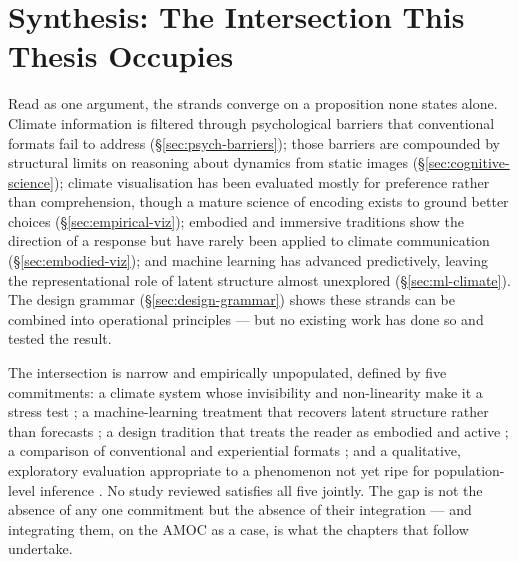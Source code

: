 \section{Synthesis: The Intersection This Thesis Occupies}
\label{sec:literature-synthesis}
 
Read as one argument, the strands converge on a proposition none states alone. Climate information is filtered through psychological barriers that conventional formats fail to address (\S\ref{sec:psych-barriers}); those barriers are compounded by structural limits on reasoning about dynamics from static images (\S\ref{sec:cognitive-science}); climate visualisation has been evaluated mostly for preference rather than comprehension, though a mature science of encoding exists to ground better choices (\S\ref{sec:empirical-viz}); embodied and immersive traditions show the direction of a response but have rarely been applied to climate communication (\S\ref{sec:embodied-viz}); and machine learning has advanced predictively, leaving the representational role of latent structure almost unexplored (\S\ref{sec:ml-climate}). The design grammar (\S\ref{sec:design-grammar}) shows these strands can be combined into operational principles --- but no existing work has done so and tested the result.
 
The intersection is narrow and empirically unpopulated, defined by five commitments: a climate system whose invisibility and non-linearity make it a stress test \citep{lenton2008, armstrongmckay2022}; a machine-learning treatment that recovers latent structure rather than forecasts \citep{sonnewald2019, iten2020}; a design tradition that treats the reader as embodied and active \citep{lakoff1999, jansen2015, marriott2018}; a comparison of conventional and experiential formats \citep{harold2016, kause2020}; and a qualitative, exploratory evaluation appropriate to a phenomenon not yet ripe for population-level inference \citep{braunclarke2006}. No study reviewed satisfies all five jointly. The gap is not the absence of any one commitment but the absence of their integration --- and integrating them, on the AMOC as a case, is what the chapters that follow undertake.